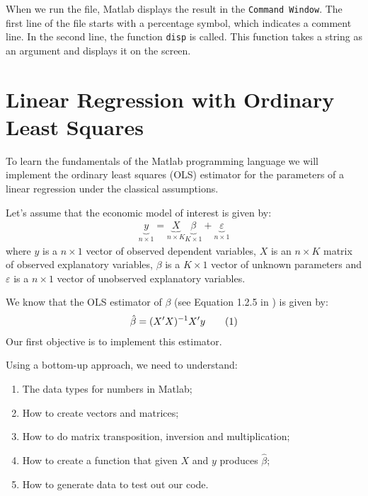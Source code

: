 \documentclass[12pt, a4paper]{article}
\newcommand\numberthis{\addtocounter{equation}{1}\tag{\theequation}}
\begin{document}
When we run the file, Matlab displays the result in the \texttt{Command Window}.
The first line of the file starts with a percentage symbol, which indicates a comment line.
In the second line, the function \texttt{disp} is called.
This function takes a string as an argument and displays it on the screen.

\section{Linear Regression with Ordinary Least Squares}
\label{sec:org8e85dc9}
To learn the fundamentals of the Matlab programming language we will implement the ordinary least squares (OLS) estimator for the parameters of a linear regression under the classical assumptions.

Let's assume that the economic model of interest is given by:
\begin{align*}
\underbrace{y}_{n \times 1}=\underbrace{X}_{n\times K}\underbrace{\beta}_{K\times 1} + \underbrace{\varepsilon}_{n\times 1}
\end{align*}
where \(y\) is a \(n\times 1\) vector of observed dependent variables, \(X\) is an \(n \times K\) matrix of observed explanatory variables, \(\beta\) is a \(K\times 1\) vector of unknown parameters and \(\varepsilon\) is a \(n\times 1\) vector of unobserved explanatory variables.

We know that the OLS estimator of \(\beta\) (see Equation 1.2.5 in \citet{H2000}) is given by:
\begin{align*}
\hat{\beta}=(X'X)^{-1}X'y\numberthis\label{OLS_beta}
\end{align*}
Our first objective is to implement this estimator.

Using a bottom-up approach, we need to understand:
\begin{enumerate}
\item The data types for numbers in Matlab;
\item How to create vectors and matrices;
\item How to do matrix transposition, inversion and multiplication;
\item How to create a function that given \(X\) and \(y\) produces \(\hat{\beta}\);
\item How to generate data to test out our code.
\end{enumerate}
\end{document}
